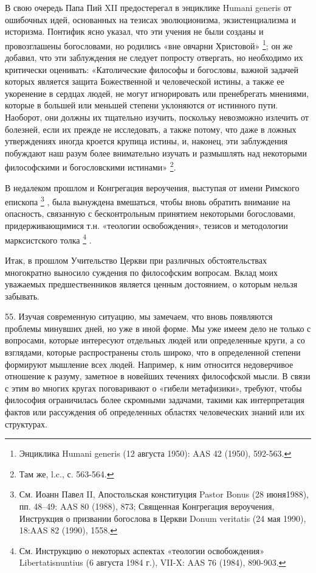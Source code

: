\documentclass[a5paper,10pt]{article}
\begin{document}
В свою очередь Папа Пий XII предостерегал в энциклике Humani generis от
ошибочных идей, основанных на тезисах эволюционизма, экзистенциализма и
историзма. Понтифик ясно указал, что эти учения не были созданы и провозглашены
богословами, но родились «вне овчарни Христовой»  \footnote{Энциклика Humani
generis (12 августа 1950): AAS 42 (1950), 592-563.}; он же добавил, что эти
заблуждения не следует попросту отвергать, но необходимо их критически
оценивать: «Католические философы и богословы, важной задачей которых является
защита Божественной и человеческой истины, а также ее укоренение в сердцах
людей, не могут игнорировать или пренебрегать мнениями, которые в большей или
меньшей степени уклоняются от истинного пути. Наоборот, они должны их тщательно
изучить, поскольку невозможно излечить от болезней, если их прежде не
исследовать, а также потому, что даже в ложных утверждениях иногда кроется
крупица истины, и, наконец, эти заблуждения побуждают наш разум более
внимательно изучать и размышлять над некоторыми философскими и богословскими
истинами» \footnote{Там же, l.c., с. 563-564.}.

В недалеком прошлом и Конгрегация вероучения, выступая от имени Римского
епископа \footnote{См. Иоанн Павел II, Апостольская конституция Pastor Bonus
(28 июня1988), пп. 48–49: AAS 80 (1988), 873; Священная Конгрегация вероучения,
Инструкция о призвании богослова в Церкви Donum veritatis (24 мая 1990), 18:AAS
82 (1990), 1558.} , была вынуждена вмешаться, чтобы вновь обратить внимание на
опасность, связанную с бесконтрольным принятием некоторыми богословами,
придерживающимися т.н. «теологии освобождения», тезисов и методологии
марксистского толка \footnote{См. Инструкцию о некоторых аспектах «теологии
освобождения» Libertatisnuntius (6 августа 1984 г.), VII-X: AAS 76 (1984),
890-903.} .

Итак, в прошлом Учительство Церкви при различных обстоятельствах многократно
выносило суждения по философским вопросам. Вклад моих уважаемых
предшественников является ценным достоянием, о которым нельзя забывать.

55. Изучая современную ситуацию, мы замечаем, что вновь появляются проблемы
минувших дней, но уже в иной форме. Мы уже имеем дело не только с вопросами,
которые интересуют отдельных людей или определенные круги, а со взглядами,
которые распространены столь широко, что в определенной степени формируют
мышление всех людей. Например, к ним относится недоверчивое отношение к разуму,
заметное в новейших течениях философской мысли. В связи с этим во многих кругах
поговаривают о «гибели метафизики», требуют, чтобы философия ограничилась более
скромными задачами, такими как интерпретация фактов или рассуждения об
определенных областях человеческих знаний или их структурах.
\end{document}
